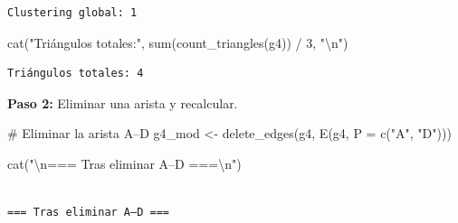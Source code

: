 \documentclass[
  letterpaper,
  DIV=11,
  numbers=noendperiod]{scrreprt}
\newenvironment{Shaded}{\begin{snugshade}}{\end{snugshade}}
\newcommand{\AttributeTok}[1]{\textcolor[rgb]{0.40,0.45,0.13}{#1}}
\newcommand{\CommentTok}[1]{\textcolor[rgb]{0.37,0.37,0.37}{#1}}
\newcommand{\ControlFlowTok}[1]{\textcolor[rgb]{0.00,0.23,0.31}{\textbf{#1}}}
\newcommand{\DecValTok}[1]{\textcolor[rgb]{0.68,0.00,0.00}{#1}}
\newcommand{\FunctionTok}[1]{\textcolor[rgb]{0.28,0.35,0.67}{#1}}
\newcommand{\NormalTok}[1]{\textcolor[rgb]{0.00,0.23,0.31}{#1}}
\newcommand{\OtherTok}[1]{\textcolor[rgb]{0.00,0.23,0.31}{#1}}
\newcommand{\SpecialCharTok}[1]{\textcolor[rgb]{0.37,0.37,0.37}{#1}}
\newcommand{\StringTok}[1]{\textcolor[rgb]{0.13,0.47,0.30}{#1}}
\begin{document}
\begin{tcolorbox}
\begin{verbatim}
Clustering global: 1 
\end{verbatim}

\begin{Shaded}
\begin{Highlighting}[]
\FunctionTok{cat}\NormalTok{(}\StringTok{"Triángulos totales:"}\NormalTok{, }\FunctionTok{sum}\NormalTok{(}\FunctionTok{count\_triangles}\NormalTok{(g4)) }\SpecialCharTok{/} \DecValTok{3}\NormalTok{, }\StringTok{"}\SpecialCharTok{\textbackslash{}n}\StringTok{"}\NormalTok{)}
\end{Highlighting}
\end{Shaded}

\begin{verbatim}
Triángulos totales: 4 
\end{verbatim}

\textbf{Paso 2:} Eliminar una arista y recalcular.

\begin{Shaded}
\begin{Highlighting}[]
\CommentTok{\# Eliminar la arista A–D}
\NormalTok{g4\_mod }\OtherTok{\textless{}{-}} \FunctionTok{delete\_edges}\NormalTok{(g4, }\FunctionTok{E}\NormalTok{(g4, }\AttributeTok{P =} \FunctionTok{c}\NormalTok{(}\StringTok{"A"}\NormalTok{, }\StringTok{"D"}\NormalTok{)))}

\FunctionTok{cat}\NormalTok{(}\StringTok{"}\SpecialCharTok{\textbackslash{}n}\StringTok{=== Tras eliminar A–D ===}\SpecialCharTok{\textbackslash{}n}\StringTok{"}\NormalTok{)}
\end{Highlighting}
\end{Shaded}

\begin{verbatim}

=== Tras eliminar A–D ===
\end{verbatim}

\begin{Shaded}
\end{Shaded}


\end{tcolorbox}
\end{document}
